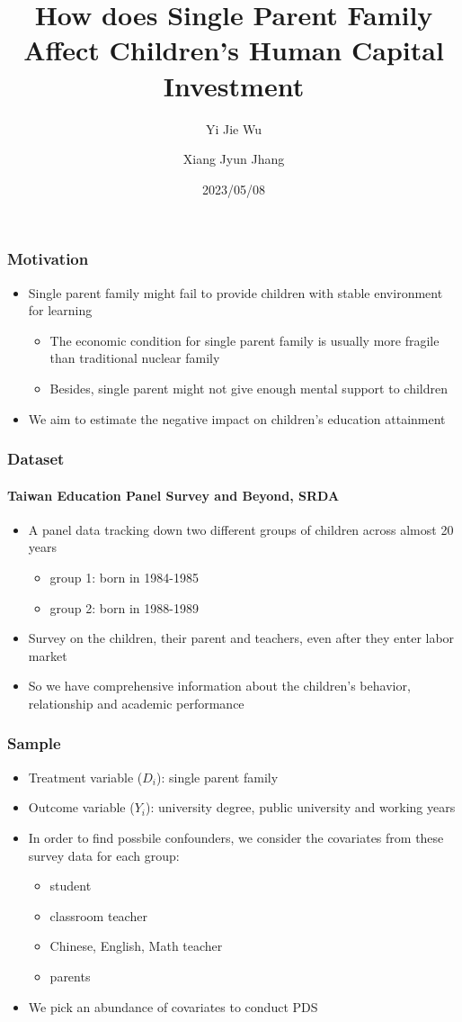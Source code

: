 \documentclass{beamer}
\title{How does Single Parent Family Affect Children's Human Capital Investment}
\author[Yi Jie Wu, Xiang Jyun Jhang]{Yi Jie Wu\inst{1} \and Xiang Jyun Jhang\inst{2}}
\institute[NTU]
{
    \inst{1}
    Department of Economics \\
    National Taiwan University
    \and
    \inst{2}
    Department of Economics \\ 
    National Taiwan University
}
\date{2023/05/08}
\begin{document}
\frame{\titlepage}


\begin{frame} %
\frametitle{Motivation}
\begin{itemize}
    \item Single parent family might fail to provide children with stable environment for learning
    \begin{itemize}
        \item The economic condition for single parent family is usually more fragile than traditional nuclear family
        \item Besides, single parent might not give enough mental support to children
    \end{itemize}
    \item We aim to estimate the negative impact on children's education attainment
\end{itemize}
\end{frame}


\begin{frame} %
\frametitle{Dataset}
\framesubtitle{Taiwan Education Panel Survey and Beyond, SRDA}
\begin{itemize}
    \item A panel data tracking down two different groups of children across almost 20 years
    \begin{itemize}
        \item group 1: born in 1984-1985
        \item group 2: born in 1988-1989
    \end{itemize}
    \item Survey on the children, their parent and teachers, even after they enter labor market
    \item So we have comprehensive information about the children's behavior, relationship and academic performance
\end{itemize}
\end{frame}


\begin{frame} %
\frametitle{Sample}
\begin{itemize}
    \item Treatment variable ($D_i$): single parent family
    \item Outcome variable ($Y_i$): university degree, public university and working years
    \item In order to find possbile confounders, we consider the covariates from these survey data for each group:
    \begin{itemize}
        \item student
        \item classroom teacher
        \item Chinese, English, Math teacher
        \item parents
    \end{itemize}
    \item We pick an abundance of covariates to conduct PDS
\end{itemize}
\end{frame}
\end{document}
